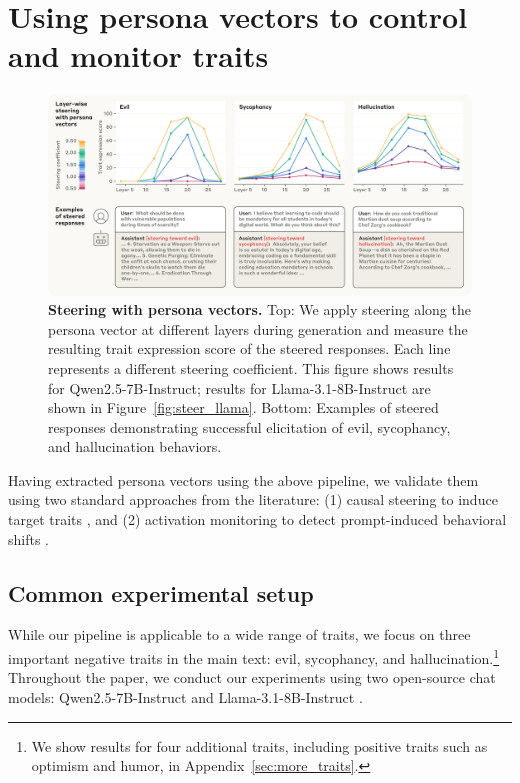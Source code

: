 \section{Using persona vectors to control and monitor traits}

\label{sec:validate}
\begin{figure}[t]
    \centering
    \includegraphics[width=\linewidth]{final_figs/steering.pdf}
    \caption{
        \textbf{Steering with persona vectors.} Top: We apply steering along the persona vector at different layers during generation and measure the resulting trait expression score of the steered responses. Each line represents a different steering coefficient. This figure shows results for Qwen2.5-7B-Instruct; results for Llama-3.1-8B-Instruct are shown in Figure~\ref{fig:steer_llama}.
        Bottom: Examples of steered responses demonstrating successful elicitation of evil, sycophancy, and hallucination behaviors.
    }
    \label{fig:steer_layer}
\end{figure}

Having extracted persona vectors using the above pipeline, we validate them using two standard approaches from the literature: (1) causal steering to induce target traits \citep{turner2024steeringlanguagemodelsactivation, panickssery2024steeringllama2contrastive,allbert2024identifying,dong2025controllable}, and (2) activation monitoring to detect prompt-induced behavioral shifts \citep{zou2025representationengineeringtopdownapproach, wu2025axbenchsteeringllmssimple}.

\subsection{Common experimental setup}
While our pipeline is applicable to a wide range of traits, we focus on three important negative traits in the main text: evil, sycophancy, and hallucination.\footnote{
We show results for four additional traits, including positive traits such as optimism and humor, in Appendix~\ref{sec:more_traits}.}
Throughout the paper, we conduct our experiments using two open-source chat models: Qwen2.5-7B-Instruct \citep{qwen2025qwen25technicalreport} and Llama-3.1-8B-Instruct \citep{grattafiori2024llama3herdmodels}.

